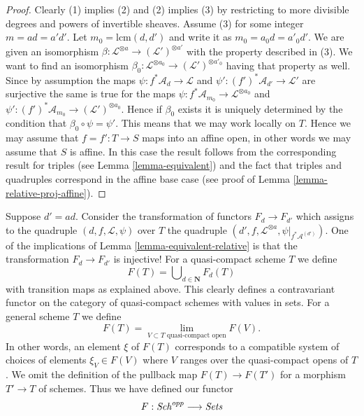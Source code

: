\begin{proof}
Clearly (1) implies (2) and (2) implies (3) by restricting to
more divisible degrees and powers of invertible sheaves.
Assume (3) for some integer $m = ad = a'd'$. Let
$m_0 = \text{lcm}(d, d')$ and write it as $m_0 = a_0d = a'_0d'$.
We are given an isomorphism
$\beta : \mathcal{L}^{\otimes a} \to (\mathcal{L}')^{\otimes a'}$
with the property described in (3). We want to find an isomorphism
$\beta_0 : \mathcal{L}^{\otimes a_0} \to (\mathcal{L}')^{\otimes a'_0}$
having that property as well.
Since by assumption the maps $\psi : f^*\mathcal{A}_d \to \mathcal{L}$
and $\psi' : (f')^*\mathcal{A}_{d'} \to \mathcal{L}'$ are surjective the
same is true for the maps
$\psi : f^*\mathcal{A}_{m_0} \to \mathcal{L}^{\otimes a_0}$
and $\psi' : (f')^*\mathcal{A}_{m_0} \to (\mathcal{L}')^{\otimes a_0}$.
Hence if $\beta_0$ exists it is uniquely determined by the
condition that $\beta_0 \circ \psi = \psi'$. This means that
we may work locally on $T$. Hence we may assume that
$f = f' : T \to S$ maps into an affine open, in other words
we may assume that $S$ is affine. In this case the result follows
from the corresponding result for triples (see Lemma \ref{lemma-equivalent})
and the fact that triples and quadruples correspond in the
affine base case (see proof of Lemma \ref{lemma-relative-proj-affine}).
\end{proof}

\noindent
Suppose $d' = ad$. Consider the transformation of functors $F_d \to F_{d'}$
which assigns to the quadruple $(d, f, \mathcal{L}, \psi)$ over
$T$ the quadruple
$(d', f, \mathcal{L}^{\otimes a}, \psi|_{f^*\mathcal{A}^{(d')}})$.
One of the implications of Lemma \ref{lemma-equivalent-relative} is that the
transformation $F_d \to F_{d'}$ is injective!
For a quasi-compact scheme $T$ we define
$$
F(T) = \bigcup\nolimits_{d \in \mathbf{N}} F_d(T)
$$
with transition maps as explained above. This clearly defines a
contravariant functor on the category of quasi-compact schemes
with values in sets. For a general scheme
$T$ we define
$$
F(T)
=
\lim_{V \subset T\text{ quasi-compact open}} F(V).
$$
In other words, an element $\xi$ of $F(T)$ corresponds to a compatible system
of choices of elements $\xi_V \in F(V)$ where $V$ ranges over the
quasi-compact opens of $T$.
We omit the definition of the pullback map $F(T) \to F(T')$
for a morphism $T' \to T$ of schemes.
Thus we have defined our functor
\begin{equation}
\label{equation-proj}
F : \mathit{Sch}^{opp} \longrightarrow \textit{Sets}
\end{equation}

